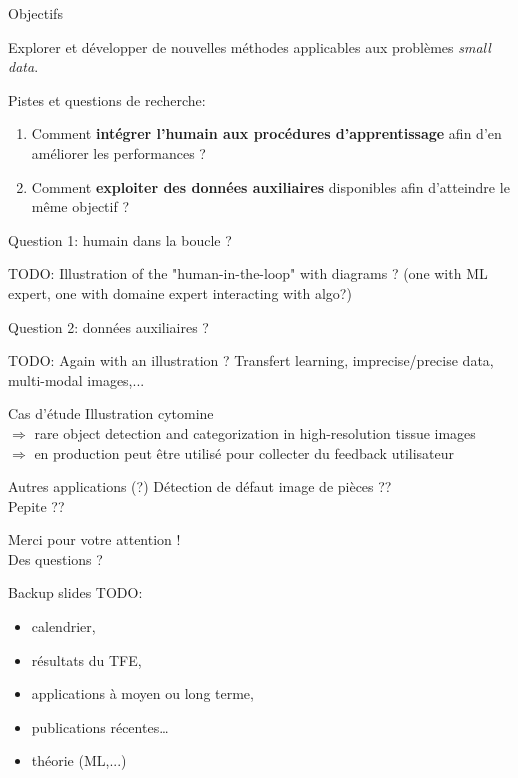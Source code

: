 \documentclass{beamer}
\begin{document}
\begin{frame}{Objectifs}
	\begin{center}
		\large
		Explorer et développer de nouvelles méthodes applicables aux problèmes \textit{small data}.
	\end{center}
	
	\vspace{0.5cm}
	Pistes et questions de recherche: 
	\begin{enumerate}
		\item Comment \textbf{intégrer l'humain aux procédures d'apprentissage} afin d'en améliorer les performances ?
		\item Comment \textbf{exploiter des données auxiliaires} disponibles afin d'atteindre le même objectif ? 
	\end{enumerate}
\end{frame}
 
\begin{frame}{Question 1: humain dans la boucle ?}
	
	TODO: Illustration of the "human-in-the-loop" with diagrams ? 
	(one with ML expert, one with domaine expert interacting with algo?)
	
\end{frame}

\begin{frame}{Question 2: données auxiliaires ?}
	
	TODO: Again with an illustration ? Transfert learning, imprecise/precise data, multi-modal images,...
	
\end{frame}

\begin{frame}{Cas d'étude}
	Illustration cytomine \\
		$\Rightarrow$ rare object detection and categorization in high-resolution tissue images \\
		$\Rightarrow$ en production peut être utilisé pour collecter du feedback utilisateur \\
\end{frame}

\begin{frame}{Autres applications (?)}
 	Détection de défaut image de pièces ??  \\
 	Pepite ?? 
\end{frame}

\begin{frame}
\begin{center}
	Merci pour votre attention ! \\ 
	Des questions ? 
\end{center}
\end{frame}


\begin{frame}{Backup slides}
TODO: \\
\begin{itemize}
	\item calendrier, 
	\item résultats du TFE, 
	\item applications à moyen ou long terme, 
	\item publications récentes…
	\item théorie (ML,...)
\end{itemize}
\end{frame}
\end{document}
